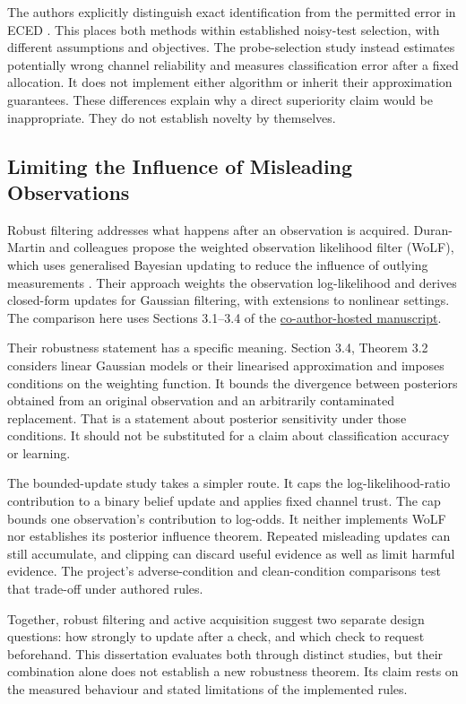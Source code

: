 The authors explicitly distinguish exact identification from the permitted error in ECED
\parencite[Section 1.2]{jia2024noisy}. This places both methods within established noisy-test selection, with different
assumptions and objectives. The probe-selection study instead estimates potentially wrong channel reliability and measures classification error
after a fixed allocation. It does not implement either algorithm or inherit their approximation guarantees. These differences
explain why a direct superiority claim would be inappropriate. They do not establish novelty by themselves.

\subsection{Limiting the Influence of Misleading Observations}

Robust filtering addresses what happens after an observation is acquired. Duran-Martin and colleagues propose the weighted
observation likelihood filter (WoLF), which uses generalised Bayesian updating to reduce the influence of outlying measurements
\parencite{duranmartin2024outlier}. Their approach weights the observation log-likelihood and derives closed-form updates for
Gaussian filtering, with extensions to nonlinear settings. The comparison here uses Sections 3.1--3.4 of the
\href{https://utstat.utoronto.ca/~alexander/wolf-icml.pdf}{co-author-hosted manuscript}.

Their robustness statement has a specific meaning. Section 3.4, Theorem 3.2 considers linear Gaussian models or their linearised
approximation and imposes conditions on the weighting function. It bounds the divergence between posteriors obtained from an
original observation and an arbitrarily contaminated replacement. That is a statement about posterior sensitivity under those
conditions. It should not be substituted for a claim about classification accuracy or learning.

The bounded-update study takes a simpler route. It caps the log-likelihood-ratio contribution to a binary belief update and applies fixed channel
trust. The cap bounds one observation's contribution to log-odds. It neither implements WoLF nor establishes its posterior
influence theorem. Repeated misleading updates can still accumulate, and clipping can discard useful evidence as well as limit
harmful evidence. The project's adverse-condition and clean-condition comparisons test that trade-off under authored rules.

Together, robust filtering and active acquisition suggest two separate design questions: how strongly to update after a check,
and which check to request beforehand. This dissertation evaluates both through distinct studies, but their combination alone
does not establish a new robustness theorem. Its claim rests on the measured behaviour and stated limitations of the implemented
rules.

